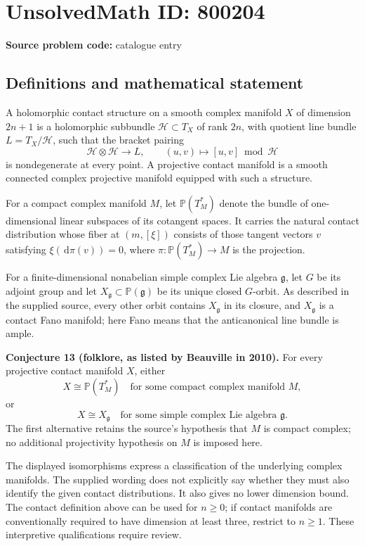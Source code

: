 \documentclass[11pt]{article}
\newcommand{\dd}{\,\mathrm{d}}
\begin{document}
\section*{UnsolvedMath ID: 800204}
\textbf{Source problem code:} catalogue entry
\subsection{Definitions and mathematical statement}
A holomorphic contact structure on a smooth complex manifold \(X\) of dimension \(2n+1\) is a holomorphic subbundle \(\mathcal H\subset T_X\) of rank \(2n\), with quotient line bundle \(L=T_X/\mathcal H\), such that the bracket pairing
\[
\mathcal H\otimes\mathcal H\longrightarrow L,\qquad (u,v)\longmapsto [u,v]\bmod\mathcal H
\]
is nondegenerate at every point. A projective contact manifold is a smooth connected complex projective manifold equipped with such a structure.

For a compact complex manifold \(M\), let \(\mathbb P(T_M^*)\) denote the bundle of one-dimensional linear subspaces of its cotangent spaces. It carries the natural contact distribution whose fiber at \((m,[\xi])\) consists of those tangent vectors \(v\) satisfying \(\xi(\dd\pi(v))=0\), where \(\pi:\mathbb P(T_M^*)\to M\) is the projection.

For a finite-dimensional nonabelian simple complex Lie algebra \(\mathfrak g\), let \(G\) be its adjoint group and let \(X_{\mathfrak g}\subset\mathbb P(\mathfrak g)\) be its unique closed \(G\)-orbit. As described in the supplied source, every other orbit contains \(X_{\mathfrak g}\) in its closure, and \(X_{\mathfrak g}\) is a contact Fano manifold; here Fano means that the anticanonical line bundle is ample.

\textbf{Conjecture 13 (folklore, as listed by Beauville in 2010).} For every projective contact manifold \(X\), either
\[
X\cong\mathbb P(T_M^*)\quad\text{for some compact complex manifold }M,
\]
or
\[
X\cong X_{\mathfrak g}\quad\text{for some simple complex Lie algebra }\mathfrak g.
\]
The first alternative retains the source's hypothesis that \(M\) is compact complex; no additional projectivity hypothesis on \(M\) is imposed here.

The displayed isomorphisms express a classification of the underlying complex manifolds. The supplied wording does not explicitly say whether they must also identify the given contact distributions. It also gives no lower dimension bound. The contact definition above can be used for \(n\geq0\); if contact manifolds are conventionally required to have dimension at least three, restrict to \(n\geq1\). These interpretive qualifications require review.
\end{document}
